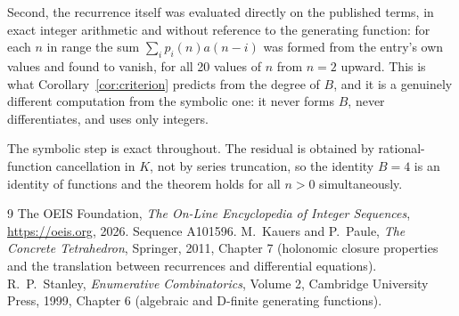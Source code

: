 \documentclass[11pt,a4paper]{article}
\theoremstyle{plain}
\theoremstyle{definition}
\begin{document}
Second, the recurrence itself was evaluated directly on the published terms, in exact
integer arithmetic and without reference to the generating function: for each $n$ in range
the sum $\sum_{i}p_{i}(n)a(n-i)$ was formed from the entry's own values and found to
vanish, for all 20 values of $n$ from $n=2$ upward. This is what
Corollary~\ref{cor:criterion} predicts from the degree of $B$, and it is a genuinely
different computation from the symbolic one: it never forms $B$, never differentiates, and
uses only integers.

The symbolic step is exact throughout. The residual is obtained by rational-function
cancellation in $K$, not by series truncation, so the identity $B=4$ is an
identity of functions and the theorem holds for all $n>0$ simultaneously.

\begin{thebibliography}{9}
 The OEIS Foundation, \emph{The On-Line Encyclopedia of Integer Sequences},
\url{https://oeis.org}, 2026. Sequence A101596.
 M.~Kauers and P.~Paule, \emph{The Concrete Tetrahedron}, Springer, 2011,
Chapter 7 (holonomic closure properties and the translation between recurrences and
differential equations).
 R.~P.~Stanley, \emph{Enumerative Combinatorics}, Volume 2, Cambridge
University Press, 1999, Chapter 6 (algebraic and D-finite generating functions).
\end{thebibliography}
\end{document}
